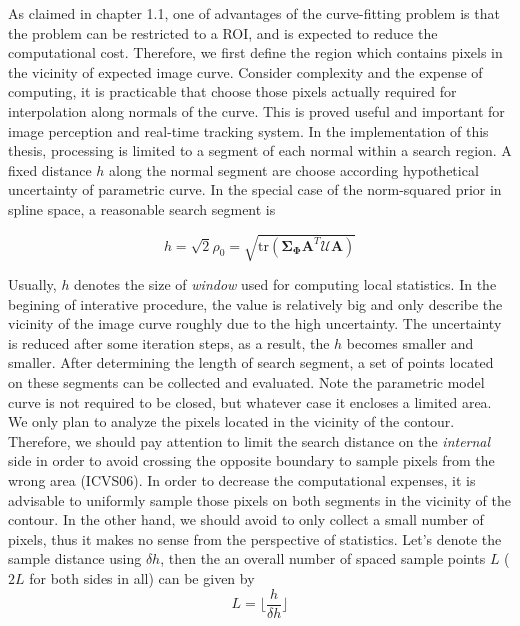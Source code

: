 As claimed in chapter 1.1, one of advantages of the curve-fitting
problem is that the problem can be restricted to a ROI, and is
expected to reduce the computational cost. Therefore, we first define
the region which contains pixels in the vicinity of expected image
curve. 
Consider complexity and the expense of computing, it is practicable
that choose those pixels actually required for interpolation along
normals of the curve. This is proved useful and important for image
perception and real-time tracking system. In the implementation of
this thesis, processing is limited to a segment of each normal within
a search region. A fixed distance $h$ along the normal segment are
choose according hypothetical uncertainty of parametric curve. In the
special case of the norm-squared prior in spline space, a reasonable
search segment is 

\begin{equation}
  \label{eq:5.4}
  h = \sqrt{2} \rho_0 = \sqrt{\mathrm{tr}(\mathbf{\Sigma}_{\mathbf{\Phi}}\mathbf{A}^T\mathcal{U}\mathbf{A})}
\end{equation}

Usually, $h$ denotes the size of \textit{window} used for computing
local statistics. In the begining of interative procedure, the value
is relatively big and only describe the vicinity of the image curve
roughly due to the high uncertainty. The
uncertainty is reduced after some iteration steps, as a result, the $h$ becomes smaller and
smaller. After determining the length of search segment, 
a set of points located on these segments can be collected and
evaluated. Note the parametric model curve is not required to be
closed, but whatever case it encloses a limited area. We only plan to
analyze the pixels located in the vicinity of the contour. Therefore,
we should pay attention to limit the search distance on the
\textit{internal} side in order to avoid crossing the opposite
boundary to sample pixels from the wrong area (ICVS06). In order to
decrease the computational expenses, it is advisable to uniformly sample those
pixels on both segments in the vicinity of the contour. In the other
hand, we should avoid to only collect a small number of pixels, thus
it makes no sense from the perspective of statistics. Let's denote the
sample distance using $\delta h$, then the an overall number of spaced
sample points $L$ ($2L$ for both sides in all) can be given by 
\begin{equation}
  \label{eq:5.5}
  L = \lfloor \frac{h}{\delta h} \rfloor
\end{equation}

